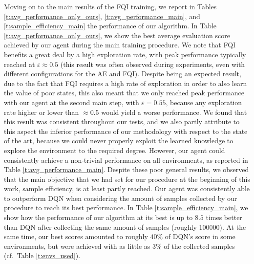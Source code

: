 Moving on to the main results of the FQI training, we report in Tables 
\ref{t:avg_performance_only_ours}, \ref{t:avg_performance_main}, and 
\ref{t:sample_efficiency_main} the performance of our algorithm.
In Table \ref{t:avg_performance_only_ours}, we show the best average evaluation 
score achieved by our agent during the main training procedure.
We note that FQI benefits a great deal by a high exploration rate, with peak 
performance typically reached at $\varepsilon\approx0.5$ (this result was often
observed during experiments, even with different configurations for the AE and
FQI). Despite being an expected result, due to the fact that FQI requires
a high rate of exploration in order to also learn the value of poor states, 
this also meant that we only reached peak performance with our agent at the 
second main step, with $\varepsilon = 0.55$, because any exploration rate 
higher or lower than $\approx 0.5$ would yield a worse performance. 
We found that this result was consistent throughout our tests, and we also 
partly attribute to this aspect the inferior performance of our methodology with
respect to the state of the art, because we could never properly exploit the 
learned knowledge to explore the environment to the required degree.
However, our agent could consistently achieve a non-trivial performance on all
environments, as reported in Table \ref{t:avg_performance_main}.
Despite these poor general results, we observed that the main objective that 
we had set for our procedure at the beginning of this work, sample efficiency, 
is at least partly reached. 
Our agent was consistently able to outperform DQN when 
considering the amount of samples collected by our procedure to reach its best 
performance. In Table \ref{t:sample_efficiency_main}, we show how the 
performance of our algorithm at its best is up to $8.5$ times better than DQN 
after collecting the same amount of samples (roughly $100000$).
At the same time, our best scores amounted to roughly $40\%$ of DQN's score
in some environments, but were achieved with as little as $3\%$ of the 
collected samples (cf.\ Table \ref{t:envs_used}).

